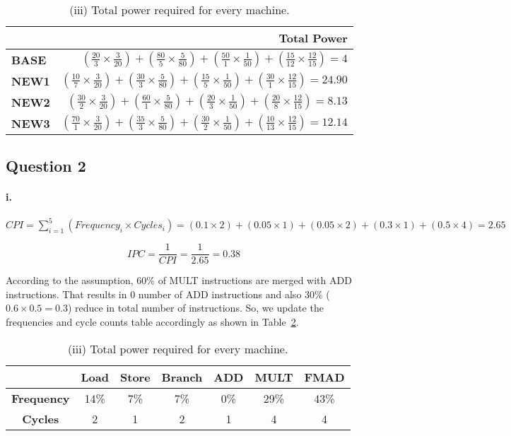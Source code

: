 \documentclass[12pt]{article}
\newcommand{\q}[1]{\subsection*{Question {#1}}}
\renewcommand{\part}[1]{\paragraph*{{#1}.}}
\begin{document}
\begin{table}[h]
\center
\begin{tabular}{|l|r|}
	\hline
	 & \textbf{Total Power} \\
	\hline
	\textbf{BASE} & $(\frac{20}{3} \times \frac{3}{20}) + (\frac{80}{5} \times 
	\frac{5}{80}) + (\frac{50}{1} \times \frac{1}{50}) + (\frac{15}{12} \times 
	\frac{12}{15})  = 4$  \\
	\hline
	\textbf{NEW1} & $(\frac{10}{7} \times \frac{3}{20}) + (\frac{30}{3} \times 
	\frac{5}{80}) + (\frac{15}{5} \times \frac{1}{50}) + 
	(\frac{30}{1} \times \frac{12}{15}) = 24.90$ \\
	\hline
	\textbf{NEW2} & $(\frac{30}{2} \times \frac{3}{20}) + (\frac{60}{1} \times 
	\frac{5}{80}) + (\frac{20}{3} \times \frac{1}{50}) + 
	(\frac{20}{8} \times \frac{12}{15}) = 8.13$ \\
	\hline
	\textbf{NEW3} & $(\frac{70}{1} \times \frac{3}{20}) + (\frac{35}{3} \times 
	\frac{5}{80}) + (\frac{30}{2} \times \frac{1}{50}) + 
	(\frac{10}{13} \times \frac{12}{15}) = 12.14$ \\
	\hline
\end{tabular}
\caption{(iii) Total power required for every machine.}
\label{tbl:wpwr}
\end{table}

\q{2}
\part{i} 
$
CPI = \sum \limits_{i=1}^{5} (Frequency_i \times Cycles_i) = 
(0.1 \times 2) + (0.05 \times 1) + (0.05 \times 2) + (0.3 \times 1) + 
(0.5 \times 4) = 2.65
$

$$
IPC = \frac{1}{CPI} = \frac{1}{2.65} = 0.38
$$

According to the assumption, 60\% of MULT instructions are merged with ADD 
instructions. That results in 0 number of ADD instructions and also 30\% 
($0.6 \times 0.5 = 0.3$) reduce in total number of instructions. So, we update 
the frequencies and cycle counts table accordingly as shown in 
Table~\ref{tbl:newfreq}.

\begin{table}[h]
\center
\begin{tabular}{|c|c|c|c|c|c|c|}
	\hline
	 & \textbf{Load} & \textbf{Store} & \textbf{Branch} & \textbf{ADD} & 
	 \textbf{MULT} & \textbf{FMAD} \\
	\hline
	\textbf{Frequency} & 14\% & 7\% & 7\% & 0\% & 29\% & 43\% \\
	\hline
	\textbf{Cycles} & 2 & 1 & 2 & 1 & 4 & 4 \\
	\hline
\end{tabular}
\caption{(iii) Total power required for every machine.}
\label{tbl:newfreq}
\end{table}
\end{document}
